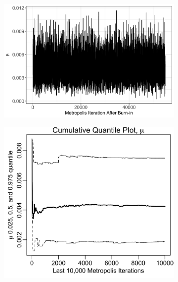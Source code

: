 \documentclass{uwstat572}
\begin{document}
\begin{figure}[H]
	\centering
	\begin{subfigure}[b]{\textwidth}
		\includegraphics[width=\textwidth]{figures/mu_mcmc_chain.png}
		\caption{}
	\label{fig:quant_mu}
	\end{subfigure}
	\qquad
	\begin{subfigure}[b]{0.49\textwidth}
		\includegraphics[width=\textwidth]{figures/mcmc_cum_quant_plot_mu.png}
		\caption{}
		\label{fig:quant_mu}
	\end{subfigure}
	\hfill
	\begin{subfigure}[b]{0.49\textwidth}

\end{subfigure}
\end{figure}
\end{document}
